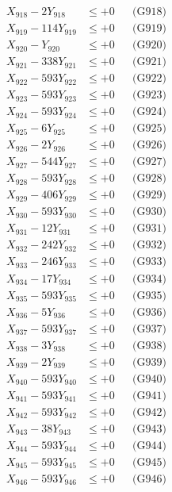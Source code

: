 \documentclass[a4paper,10pt]{article}
\begin{document}
{\begin{align}
X_{918} - 2Y_{918} &\leq +0 && \text{(G918)} \\
X_{919} - 114Y_{919} &\leq +0 && \text{(G919)} \\
X_{920} - Y_{920} &\leq +0 && \text{(G920)} \\
\allowbreak
X_{921} - 338Y_{921} &\leq +0 && \text{(G921)} \\
X_{922} - 593Y_{922} &\leq +0 && \text{(G922)} \\
X_{923} - 593Y_{923} &\leq +0 && \text{(G923)} \\
X_{924} - 593Y_{924} &\leq +0 && \text{(G924)} \\
X_{925} - 6Y_{925} &\leq +0 && \text{(G925)} \\
X_{926} - 2Y_{926} &\leq +0 && \text{(G926)} \\
X_{927} - 544Y_{927} &\leq +0 && \text{(G927)} \\
X_{928} - 593Y_{928} &\leq +0 && \text{(G928)} \\
X_{929} - 406Y_{929} &\leq +0 && \text{(G929)} \\
X_{930} - 593Y_{930} &\leq +0 && \text{(G930)} \\
\allowbreak
X_{931} - 12Y_{931} &\leq +0 && \text{(G931)} \\
X_{932} - 242Y_{932} &\leq +0 && \text{(G932)} \\
X_{933} - 246Y_{933} &\leq +0 && \text{(G933)} \\
X_{934} - 17Y_{934} &\leq +0 && \text{(G934)} \\
X_{935} - 593Y_{935} &\leq +0 && \text{(G935)} \\
X_{936} - 5Y_{936} &\leq +0 && \text{(G936)} \\
X_{937} - 593Y_{937} &\leq +0 && \text{(G937)} \\
X_{938} - 3Y_{938} &\leq +0 && \text{(G938)} \\
X_{939} - 2Y_{939} &\leq +0 && \text{(G939)} \\
X_{940} - 593Y_{940} &\leq +0 && \text{(G940)} \\
\allowbreak
X_{941} - 593Y_{941} &\leq +0 && \text{(G941)} \\
X_{942} - 593Y_{942} &\leq +0 && \text{(G942)} \\
X_{943} - 38Y_{943} &\leq +0 && \text{(G943)} \\
X_{944} - 593Y_{944} &\leq +0 && \text{(G944)} \\
X_{945} - 593Y_{945} &\leq +0 && \text{(G945)} \\
X_{946} - 593Y_{946} &\leq +0 && \text{(G946)} \\

\end{align}}
\end{document}
